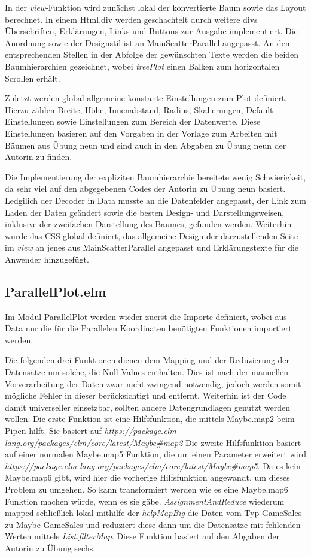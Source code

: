 \documentclass[usegeometry=true]{scrartcl}
\begin{document}
In der \textit{view}-Funktion wird zunächst lokal der konvertierte Baum sowie das Layout berechnet. In einem Html.div werden geschachtelt durch weitere divs Überschriften, Erklärungen, Links und Buttons zur Ausgabe implementiert. 
Die Anordnung sowie der Designstil ist an MainScatterParallel angepasst. An den entsprechenden Stellen in der Abfolge der gewünschten Texte werden die beiden Baumhierarchien gezeichnet, wobei \textit{treePlot} einen Balken zum horizontalen Scrollen erhält.

Zuletzt werden global allgemeine konstante Einstellungen zum Plot definiert. Hierzu zählen Breite, Höhe, Innenabstand, Radius, Skalierungen, Default-Einstellungen sowie Einstellungen zum Bereich der Datenwerte.
Diese Einstellungen basieren auf den Vorgaben in der Vorlage zum Arbeiten mit Bäumen aus Übung neun und sind auch in den Abgaben zu Übung neun der Autorin zu finden. 

Die Implementierung der expliziten Baumhierarchie bereitete wenig Schwierigkeit, da sehr viel auf den abgegebenen Codes der Autorin zu Übung neun basiert. 
Ledgilich der Decoder in Data musste an die Datenfelder angepasst, der Link zum Laden der Daten geändert sowie die besten Design- und Darstellungsweisen, inklusive der zweifachen Darstellung des Baumes, gefunden werden. 
Weiterhin wurde das CSS global definiert, das allgemeine Design der darzustellenden Seite im \textit{view} an jenes aus MainScatterParallel angepasst und Erklärungstexte für die Anwender hinzugefügt. 

\subsection{ParallelPlot.elm}
Im Modul ParallelPlot werden wieder zuerst die Importe definiert, wobei aus Data nur die für die Parallelen Koordinaten benötigten Funktionen importiert werden. 

Die folgenden drei Funktionen dienen dem Mapping und der Reduzierung der Datensätze um solche, die Null-Values enthalten. 
Dies ist nach der manuellen Vorverarbeitung der Daten zwar nicht zwingend notwendig, jedoch werden somit mögliche Fehler in dieser berücksichtigt und entfernt. 
Weiterhin ist der Code damit universeller einsetzbar, sollten andere Datengrundlagen genutzt werden wollen. 
Die erste Funktion ist eine Hilfsfunktion, die mittels Maybe.map2 beim Pipen hilft. Sie basiert auf \textit{https://package.elm-lang.org/packages/elm/core/latest/Maybe#map2}
Die zweite Hilfsfunktion basiert auf einer normalen Maybe.map5 Funktion, die um einen Parameter erweitert wird \textit{https://package.elm-lang.org/packages/elm/core/latest/Maybe#map5}. 
Da es kein Maybe.map6 gibt, wird hier die vorherige Hilfsfunktion angewandt, um dieses Problem zu umgehen. 
So kann transformiert werden wie es eine Maybe.map6 Funktion machen würde, wenn es sie gäbe.
\textit{AssignmentAndReduce} wiederum mapped schließlich lokal mithilfe der \textit{helpMapBig} die Daten vom Typ GameSales zu Maybe GameSales und reduziert diese dann um die Datensätze mit fehlenden Werten mittels \textit{List.filterMap}.
Diese Funktion basiert auf den Abgaben der Autorin zu Übung sechs.
\end{document}
